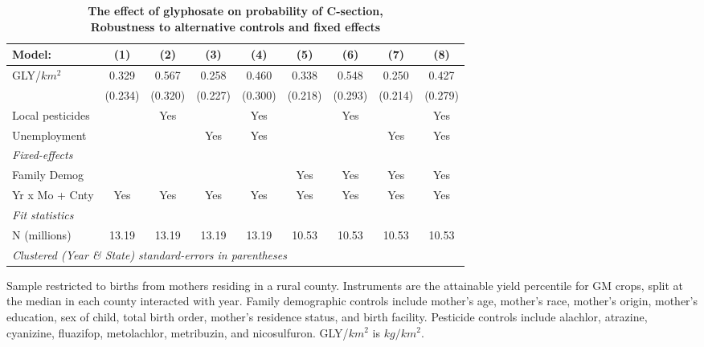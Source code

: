 \begin{table}[htbp]
   \centering
   \small
   \begin{threeparttable}[b]
      \caption{\label{tab:robust-cntrl-c_section-allyielddiffgmo500} \textbf{The effect of glyphosate on probability of C-section, \\ Robustness to alternative controls and fixed effects}}
      \begin{tabular}{lcccccccc}
         \toprule
         Model:           & (1)     & (2)     & (3)     & (4)     & (5)     & (6)     & (7)     & (8)\\  
         \midrule 
         GLY/$km^2$       & 0.329   & 0.567   & 0.258   & 0.460   & 0.338   & 0.548   & 0.250   & 0.427\\   
                          & (0.234) & (0.320) & (0.227) & (0.300) & (0.218) & (0.293) & (0.214) & (0.279)\\   
         Local pesticides &         & Yes     &         & Yes     &         & Yes     &         & Yes\\  
         Unemployment     &         &         & Yes     & Yes     &         &         & Yes     & Yes\\  
         \midrule
         \emph{Fixed-effects}\\
         Family Demog     &         &         &         &         & Yes     & Yes     & Yes     & Yes\\  
         Yr x Mo + Cnty   & Yes     & Yes     & Yes     & Yes     & Yes     & Yes     & Yes     & Yes\\  
         \midrule
         \emph{Fit statistics}\\
         N (millions)     & 13.19   & 13.19   & 13.19   & 13.19   & 10.53   & 10.53   & 10.53   & 10.53\\  
         \midrule
         \multicolumn{9}{l}{\emph{Clustered (Year \& State) standard-errors in parentheses}}\\
      \end{tabular}
      
      \begin{tablenotes}\item Sample restricted to births from mothers residing in a rural county. Instruments are the attainable yield percentile for GM crops, split at the median in each county interacted with year. Family demographic controls include mother's age, mother's race, mother's origin, mother's education, sex of child, total birth order, mother's residence status, and birth facility. Pesticide controls include alachlor, atrazine, cyanizine, fluazifop, metolachlor, metribuzin, and nicosulfuron. GLY/$km^2$ is $kg/km^2$.
      \end{tablenotes}
   \end{threeparttable}
\end{table}
